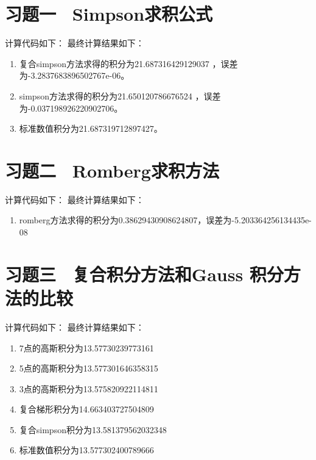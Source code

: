 \section{习题一 \ Simpson求积公式}
计算代码如下：
最终计算结果如下：
\begin{enumerate}
    \item 复合simpson方法求得的积分为21.687316429129037 ，误差为-3.2837683896502767e-06。
    \item simpson方法求得的积分为21.650120786676524 ，误差为-0.037198926220902706。
    \item 标准数值积分为21.687319712897427。
\end{enumerate}

\clearpage
\section{习题二 \ Romberg求积方法}

计算代码如下：
最终计算结果如下：
\begin{enumerate}
    \item romberg方法求得的积分为0.38629430908624807，误差为-5.203364256134435e-08
\end{enumerate}


\section{习题三 \ 复合积分方法和Gauss 积分方法的比较}

计算代码如下：
最终计算结果如下：
\begin{enumerate}
    \item 7点的高斯积分为13.57730239773161
    \item 5点的高斯积分为13.577301646358315
    \item 3点的高斯积分为13.575820922114811
    \item 复合梯形积分为14.663403727504809
    \item 复合simpson积分为13.581379562032348
    \item 标准数值积分为13.577302400789666
\end{enumerate}


